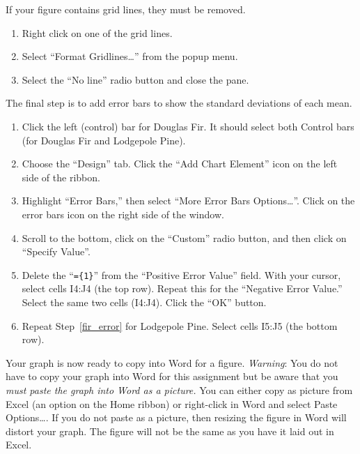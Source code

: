 \documentclass[12pt, hidelinks]{exam}
\begin{document}
If your figure contains grid lines, they must be removed.

\begin{enumerate}[resume]
	\item Right click on one of the grid lines. 
	
	\item Select “Format Gridlines\dots” from the popup menu. 
	
	\item Select the “No line” radio button and close the pane.
\end{enumerate}

The final step is to add error bars to show the standard deviations of each mean.

\begin{enumerate}[resume]

	\item Click the left (control) bar for Douglas Fir. It should select both Control bars (for Douglas Fir and Lodgepole Pine). 
	
	\item Choose the “Design” tab. Click the “Add Chart Element” icon on the left side of the ribbon.
	
	\item Highlight “Error Bars,” then select “More Error Bars Options\dots”. Click on the error bars icon on the right side of the window.
	
	\item Scroll to the bottom, click on the “Custom” radio button, and then click on “Specify Value”.
	
	\item \label{fir_error} Delete the “\texttt{=\{1\}}” from the “Positive Error Value” field. With your cursor, select cells I4:J4 (the top row). Repeat this for the “Negative Error Value.” Select the same two cells (I4:J4). Click the “OK” button.
	
	\item Repeat Step~\ref{fir_error} for Lodgepole Pine. Select cells I5:J5 (the bottom row).
	
\end{enumerate}

Your graph is now ready to copy into Word for a figure. \emph{Warning}: You do not have to copy your graph into Word for this assignment but be aware that you \emph{must paste the graph into Word as a picture.} You can either copy as picture from Excel (an option on the Home ribbon) or right-click in Word and select Paste Options\dots. If you do not paste as a picture, then resizing the figure in Word will distort your graph. The figure will not be the same as you have it laid out in Excel.
\end{document}

